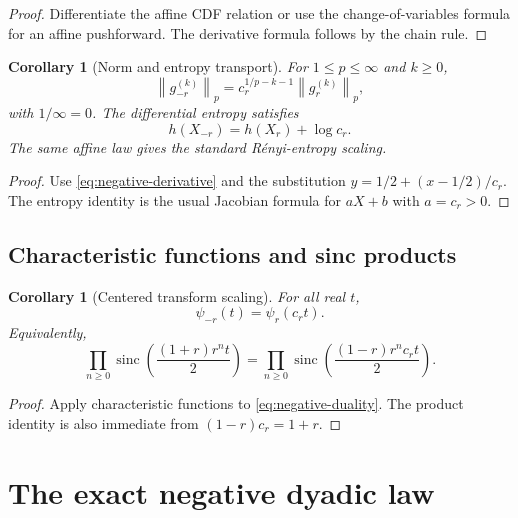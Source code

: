 \documentclass[11pt]{article}
\newtheorem{corollary}[theorem]{Corollary}
\theoremstyle{definition}
\newcommand{\sinc}{\operatorname{sinc}}
\newcommand{\norm}[1]{\left\lVert #1\right\rVert}
\begin{document}
\begin{proof}
Differentiate the affine CDF relation or use the change-of-variables formula for an
affine pushforward.  The derivative formula follows by the chain rule.
\end{proof}

\begin{corollary}[Norm and entropy transport]\label{cor:norm-entropy}
For \(1\le p\le\infty\) and \(k\ge0\),
\begin{equation}
 \norm{g_{-r}^{(k)}}_p
 =c_r^{1/p-k-1}\norm{g_r^{(k)}}_p,                        \label{eq:sobolev-scaling}
\end{equation}
with \(1/\infty=0\).  The differential entropy satisfies
\begin{equation}
 h(X_{-r})=h(X_r)+\log c_r.                               \label{eq:entropy-scaling}
\end{equation}
The same affine law gives the standard Rényi-entropy scaling.
\end{corollary}

\begin{proof}
Use \cref{eq:negative-derivative} and the substitution
\(y=1/2+(x-1/2)/c_r\).  The entropy identity is the usual Jacobian formula for
\(aX+b\) with \(a=c_r>0\).
\end{proof}

\subsection{Characteristic functions and sinc products}

\begin{corollary}[Centered transform scaling]\label{cor:negative-char}
For all real \(t\),
\begin{equation}
 \boxed{\psi_{-r}(t)=\psi_r(c_rt).}                       \label{eq:negative-char}
\end{equation}
Equivalently,
\begin{equation}
 \prod_{n\ge0}\sinc\!\left(\frac{(1+r)r^nt}{2}\right)
 =\prod_{n\ge0}\sinc\!\left(\frac{(1-r)r^nc_rt}{2}\right).
\end{equation}
\end{corollary}

\begin{proof}
Apply characteristic functions to \cref{eq:negative-duality}.  The product identity is
also immediate from \((1-r)c_r=1+r\).
\end{proof}

\section{The exact negative dyadic law}
\end{document}
